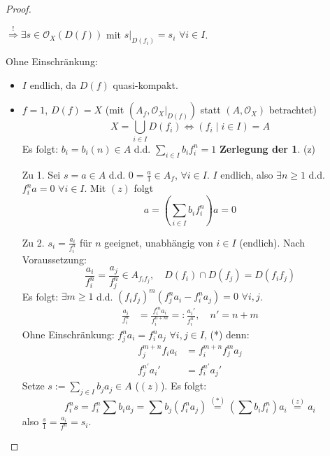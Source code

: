 \begin{proof}
\begin{enumerate}
    $\overset{!}{\Rightarrow}\exists s\in\mathcal{O}_{X}(D(f))$ mit $s|_{D(f_{i})}=s_{i}$
    $\forall i\in I$.
  \end{enumerate}
  Ohne Einschränkung:
  \begin{itemize}
  \item $I$ endlich, da $D(f)$ quasi-kompakt.
  \item $f=1$, $D(f)=X$ (mit $(A_{f},\mathcal{O}_{X}|_{D(f)})$ statt $(A,\mathcal{O}_{X})$
    betrachtet) 
    \[
    X=\bigcup_{i\in I}D(f_{i})\Leftrightarrow(f_{i}\mid i\in I)=A
    \]
    Es folgt: $b_{i}=b_{i}(n)\in A$ d.d. $\sum_{i\in I}b_{i}f_{i}^{n}=1$
    \textbf{Zerlegung der 1}. (z)
  \item[Zu 1.] Sei $s=a\in A$ d.d. $0=\frac{a}{1}\in A_{f}$, $\forall i\in I$.
    $I$ endlich, also $\exists n\geq1$ d.d. $f_{i}^{n}a=0$ $\forall i\in I$.
    Mit $(z)$ folgt
    \[
    a=\left(\sum_{i\in I}b_{i}f_{i}^{n}\right)a=0
    \]
  \item[Zu 2.] $s_{i}=\frac{a_{i}}{f_{i}^{n}}$ für $n$ geeignet, unabhängig von
    $i\in I$ (endlich). Nach Voraussetzung:
    \[
    \frac{a_{i}}{f_{i}^{n}}=\frac{a_{j}}{f_{j}^{n}}\in A_{f_{i}f_{j}},\quad D(f_{i})\cap D(f_{j})=D(f_{i}f_{j})
    \]
    Es folgt: $\exists m\geq1$ d.d. $(f_{i}f_{j})^{m}(f_{j}^{n}a_{i}-f_{i}^{n}a_{j})=0$
    $\forall i,j$.
    \begin{align*}
      \frac{a_{i}}{f_{i}^{n}} & =\frac{f_{i}^{m}a_{i}}{f_{i}^{n+m}}=:\frac{a_{i}'}{f_{i}^{n'}},\quad n'=n+m
    \end{align*}
    Ohne Einschränkung: $f_{j}^{n}a_{i}=f_{i}^{n}a_{j}$ $\forall i,j\in I$,
    ({*}) denn:
    \begin{align*}
      f_{j}^{m+n}f_{i}a_{i} & =f_{i}^{m+n}f_{j}^{m}a_{j}\\
      f_{j}^{n'}a_{i}' & =f_{i}^{n'}a_{j}'
    \end{align*}
    Setze $s:=\sum_{j\in I}b_{j}a_{j}\in A$ ($(z)$). Es folgt:
    \[
    f_{i}^{n}s=f_{i}^{n}\sum b_{i}a_{j}=\sum b_{j}(f_{i}^{n}a_{j})\overset{(*)}{=}\left(\sum b_{i}f_{i}^{n}\right)a_{i}\overset{(z)}{=}a_{i}
    \]
    also $\frac{s}{1}=\frac{a_{i}}{f^{n}}=s_{i}$.
  \end{itemize}
\end{proof}
